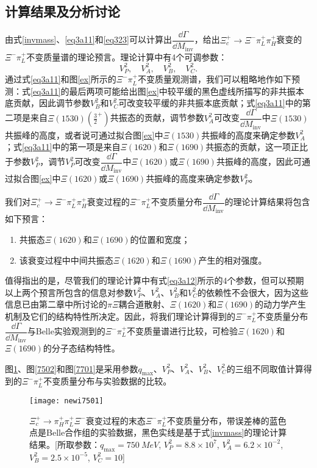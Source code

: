 \subsection{计算结果及分析讨论}
由式\eqref{invmass}、\eqref{eq3a11}和\eqref{eq323}可以计算出$\dfrac{\dd\Gamma}{\dd M_{\text{inv}}}$，给出$\Xi_{c}^{+}\to\Xi^{-}\pi_{L}^{+}\pi_{H}^{+}$衰变的$\Xi^{-}\pi_{L}^{+}$不变质量谱的理论预言。理论计算中有4个可调参数：
\begin{equation}
\label{eq3a12}
	V_{P}^2,\quad V_A^2,\quad V_B^2,\quad V_C^2.
\end{equation}
通过式\eqref{eq3a11}和图\ref{ex}所示的$\Xi^{-}\pi_{L}^{+}$不变质量观测谱，我们可以粗略地作如下预测：式\eqref{eq3a11}的最后两项可能给出图\ref{ex}中较平缓的黑色虚线所描写的非共振本底贡献，因此调节参数$V_B^2$和$V_C^2$可改变较平缓的非共振本底贡献；式\eqref{eq3a11}中的第二项是来自$\Xi(1530)(\frac{3}{2}^{+})$共振态的贡献，调节参数$V_A^2$可改变$\dfrac{\dd\Gamma}{\dd M_{\text{inv}}}$中$\Xi(1530)$共振峰的高度，或者说可通过拟合图\ref{ex}中$\Xi(1530)$共振峰的高度来确定参数$V_A^2$；式\eqref{eq3a11}中的第一项是来自$\Xi(1620)$和$\Xi(1690)$共振态的贡献，这一项正比于参数$V_{P}^2$，调节$V_{P}^2$可改变$\dfrac{\dd\Gamma}{\dd M_{\text{inv}}}$中$\Xi(1620)$或$\Xi(1690)$共振峰的高度，因此可通过拟合图\ref{ex}中$\Xi(1620)$或$\Xi(1690)$共振峰的高度来确定参数$V_{P}^2$。\par
我们对$\Xi_{c}^{+}\to\Xi^{-}\pi^{+}_{L}\pi^{+}_{H}$衰变过程的$\Xi^{-}\pi^{+}_{L}$不变质量分布$\dfrac{\dd\Gamma}{\dd M_{\text{inv}}}$的理论计算结果将包含如下预言：
\begin{enumerate}[1)]
	\item 共振态$\Xi(1620)$和$\Xi(1690)$的位置和宽度；
	\item 该衰变过程中中间共振态$\Xi(1620)$和$\Xi(1690)$产生的相对强度。
\end{enumerate}
值得指出的是，尽管我们的理论计算中有式\eqref{eq3a12}所示的4个参数，但可以预期以上两个预言所包含的信息对参数$V_{P}^2$、$V_{A}^2$、$V_{B}^2$和$V_{C}^2$的依赖性不会很大，因为这些信息已由第二章中所讨论的$\pi\Xi$耦合道散射、$\Xi(1620)$和$\Xi(1690)$的动力学产生机制及它们的结构特性所决定。因此，将我们理论计算得到的$\Xi^{-}\pi_{L}^{+}$不变质量分布$\dfrac{\dd\Gamma}{\dd M_{\text{inv}}}$与Belle实验观测到的$\Xi^{-}\pi_{L}^{+}$不变质量谱进行比较，可检验$\Xi(1620)$和$\Xi(1690)$的分子态结构特性。\par
图\ref{7501}、图\ref{7502}和图\ref{7701}是采用参数$q_{\text{max}}$、$V_{P}^2$、$V_{A}^2$、$V_{B}^2$、$V_{C}^2$的三组不同取值计算得到的$\Xi^{-}\pi_{L}^{+}$不变质量分布与实验数据的比较。
\begin{figure}[!h]
	\centering
	\texttt{[image: newi7501]}
	\begin{spacing}{1.5}
		\caption[$\Xi^{-}\pi^{+}$不变质量分布(第一组参数)]{$\Xi_{c}^{+}\to\pi^{+}_{H}\pi^{+}_{L}\Xi^{-}$衰变过程的末态$\Xi^{-}\pi_{L}^{+}$不变质量分布，带误差棒的蓝色点是Belle合作组的实验数据\cite{PhysRevLett.122.072501}，黑色实线是基于式\eqref{invmass}的理论计算结果。[所取参数：$q_{\text{max}}=\SI{750}{MeV}$, $V_{P}^2=8.8\times10^7$, $V_A^2=6.2\times10^{-2}$, $V_B^2=2.5\times10^{-5}$, $V_C^2=10$]}
\end{spacing}
	\label{7501}
\end{figure}
